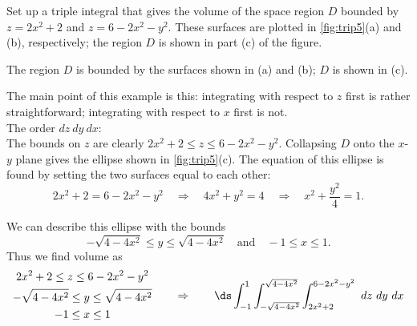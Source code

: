 \begin{example}\label{ex_trip5}
Set up a triple integral that gives the volume of the space region $D$ bounded by $z= 2x^2+2$ and $z=6-2x^2-y^2$. These surfaces are plotted in \autoref{fig:trip5}(a) and (b), respectively; the region $D$ is shown in part (c) of the figure.

\noindent\begin{minipage}[t]{\linewidth}\noindent%
\captionsetup{type=figure}%
\caption{The region $D$ is bounded by the surfaces shown in (a) and (b); $D$ is shown in (c).}
\label{fig:trip5}
\end{minipage}
\solution
The main point of this example is this: integrating with respect to $z$ first is rather straightforward; integrating with respect to $x$ first is not.\\

\noindent The order $dz\ dy\ dx$:\\

The bounds on $z$ are clearly $2x^2+2\leq z\leq 6-2x^2-y^2$. Collapsing $D$ onto the $x$-$y$ plane gives the ellipse shown in \autoref{fig:trip5}(c). The equation of this ellipse is found by setting the two surfaces equal to each other: 
\[2x^2+2 = 6-2x^2-y^2\quad \Rightarrow\quad 4x^2+y^2=4\quad \Rightarrow\quad x^2+\frac{y^2}4=1.\]

We can describe this ellipse with the bounds 
\[-\sqrt{4-4x^2} \leq y\leq \sqrt{4-4x^2}\quad \text{and}\quad -1\leq x\leq 1.\]
Thus we find volume as
\[
	\begin{gathered}
		2x^2+2\leq z\leq 6-2x^2-y^2\\
		-\sqrt{4-4x^2}\leq y\leq \sqrt{4-4x^2}\\
		-1\leq x\leq 1
	\end{gathered} 
	\qquad\Rightarrow\qquad
	\ds\int_{-1}^1\int_{-\sqrt{4-4x^2}}^{\sqrt{4-4x^2}}\int_{2x^2+2}^{6-2x^2-y^2}\ dz\ dy\ dx 
\]


\end{example}
